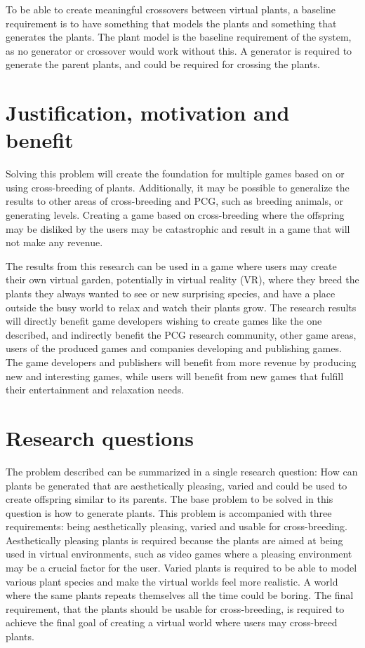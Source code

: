 To be able to create meaningful crossovers between virtual plants, a baseline requirement is to have something that models the plants and something that generates the plants.
The plant model is the baseline requirement of the system, as no generator or crossover would work without this.
A generator is required to generate the parent plants, and could be required for crossing the plants.


\section{Justification, motivation and benefit}
Solving this problem will create the foundation for multiple games based on or using cross-breeding of plants.
Additionally, it may be possible to generalize the results to other areas of cross-breeding and PCG, such as breeding animals, or generating levels.
Creating a game based on cross-breeding where the offspring may be disliked by the users may be catastrophic and result in a game that will not make any revenue.

The results from this research can be used in a game where users may create their own virtual garden, potentially in virtual reality (VR), where they breed the plants they always wanted to see or new surprising species, and have a place outside the busy world to relax and watch their plants grow.
The research results will directly benefit game developers wishing to create games like the one described, and indirectly benefit the PCG research community, other game areas, users of the produced games and companies developing and publishing games.
The game developers and publishers will benefit from more revenue by producing new and interesting games, while users will benefit from new games that fulfill their entertainment and relaxation needs.

\section{Research questions}
The problem described can be summarized in a single research question: How can plants be generated that are aesthetically pleasing, varied and could be used to create offspring similar to its parents.
The base problem to be solved in this question is how to generate plants.
This problem is accompanied with three requirements: being aesthetically pleasing, varied and usable for cross-breeding.
Aesthetically pleasing plants is required because the plants are aimed at being used in virtual environments, such as video games where a pleasing environment may be a crucial factor for the user.
Varied plants is required to be able to model various plant species and make the virtual worlds feel more realistic.
A world where the same plants repeats themselves all the time could be boring.
The final requirement, that the plants should be usable for cross-breeding, is required to achieve the final goal of creating a virtual world where users may cross-breed plants.


